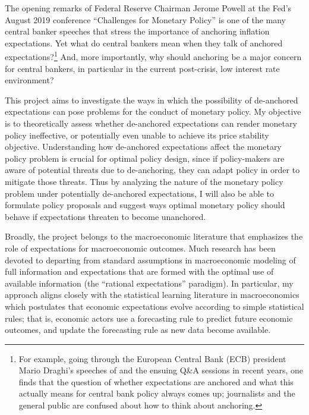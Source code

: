 \documentclass[11pt]{article}
\renewcommand{\[}{\begin{equation}}
\renewcommand{\]}{\end{equation}}
\begin{document}
The opening remarks of Federal Reserve Chairman Jerome Powell at the Fed's August 2019 conference ``Challenges for Monetary Policy'' is one of the many central banker speeches that stress the importance of anchoring inflation expectations. Yet what do central bankers mean when they talk of anchored expectations?\footnote{For example, going through the European Central Bank (ECB) president Mario Draghi's speeches of  and the ensuing Q\&A sessions in recent years, one finds that the question of whether expectations are anchored and what this actually means for central bank policy always comes up; journalists and the general public are confused about how to think about anchoring.} And, more importantly, why should anchoring be a major concern for central bankers, in particular in the current post-crisis, low interest rate environment?

This project aims to investigate the ways in which the possibility of de-anchored expectations can pose problems for the conduct of monetary policy. My objective is to theoretically assess whether de-anchored expectations can render monetary policy ineffective, or potentially even unable to achieve its price stability objective. Understanding how de-anchored expectations affect the monetary policy problem is crucial for optimal policy design, since if policy-makers are aware of potential threats due to de-anchoring, they can adapt policy in order to mitigate those threats. Thus by analyzing the nature of the monetary policy problem under potentially de-anchored expectations, I will also be able to formulate policy proposals and suggest ways optimal monetary policy should behave if expectations threaten to become unanchored.  

Broadly, the project belongs to the macroeconomic literature that emphasizes the role of expectations for macroeconomic outcomes. Much research has been devoted to departing from standard assumptions in macroeconomic modeling of full information and expectations that are formed with the optimal use of available information (the ``rational expectations'' paradigm). In particular, my approach aligns closely with the statistical learning literature in macroeconomics which postulates that economic expectations evolve according to simple statistical rules; that is, economic actors use a forecasting rule to predict future economic outcomes, and update the forecasting rule as new data become available. 
\end{document}
